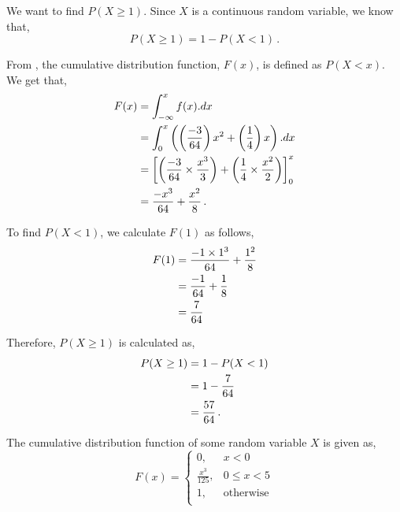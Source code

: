 \begin{subquestions}
\begin{subsubquestions}
We want to find $P(X \geq 1)$. Since $X$ is a continuous random variable, we know that, 
\begin{equation}
	P(X \geq 1) = 1 - P(X < 1) \,.
\end{equation}

From , the cumulative distribution function, $F(x)$, is defined as $P(X<x)$.
We get that,
\begin{align}
		F(x) & = \int_{-\infty}^{x} f(x).dx	\nonumber \\
		     & = \int_{0}^{x} \left( \left( \frac{-3}{64}\right)x^2+\left(\frac{1}{4}\right)x \right) .dx \nonumber \\
		     & = \left[ \left(\frac{-3}{64} \times \frac{x^3}{3}\right)+\left(\frac{1}{4}\times \frac{x^2}{2}\right) \right]^{x}_{0} \nonumber \\
		     & = \frac{-x^3}{64} + \frac{x^2}{8} \,.
\end{align}

To find $P(X<1)$, we calculate $F(1)$ as follows,
\begin{align}
	F(1) & = \frac{-1 \times 1^3}{64} + \frac{1^2}{8} \nonumber \\
	     & = \frac{-1}{64} + \frac{1}{8} \nonumber \\
	     & = \frac{7}{64}
\end{align}

Therefore, $P(X \geq 1)$ is calculated as,
\begin{align}
	P(X \geq 1) & = 1 - P(X < 1) \nonumber \\
	            & = 1 - \frac{7}{64} \nonumber \\
	            & = \frac{57}{64} \,.
\end{align}

\end{subsubquestions}


\subquestion

The cumulative distribution function of some random variable $X$ is given as,
\[
F(x) =
\begin{cases}
	0, & x<0 \\
	\frac{x^3}{125}, & \text{$0 \leq x < 5$} \\
	1,       & \text{otherwise} \\
\end{cases}
\]	
	
\begin{subsubquestions}


\end{subsubquestions}
\end{subquestions}
